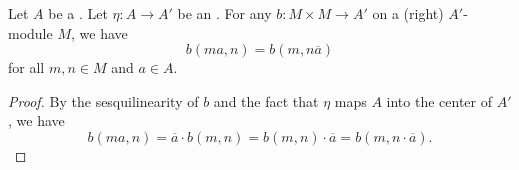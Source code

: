 \begin{lemma} \label{lemma:sesquilinear_form_passes_scalars_for_algebra_with_involution}
   Let $A$ be a . Let $\eta: A \to A'$ be an . For any  $b: M \times M \to A'$ on a (right) $A'$-module $M$, we have
   $$b(ma, n) = b(m, n\overline{a})$$
   for all $m,n \in M$ and $a \in A$.
\end{lemma}
\begin{proof}
    By the sesquilinearity of $b$ and the fact that $\eta$ maps $A$ into the center of $A'$, we have 
    $$b(ma,n) = \overline{a} \cdot b(m,n) = b(m,n) \cdot \overline{a} = b(m, n \cdot \overline{a}).$$
\end{proof}